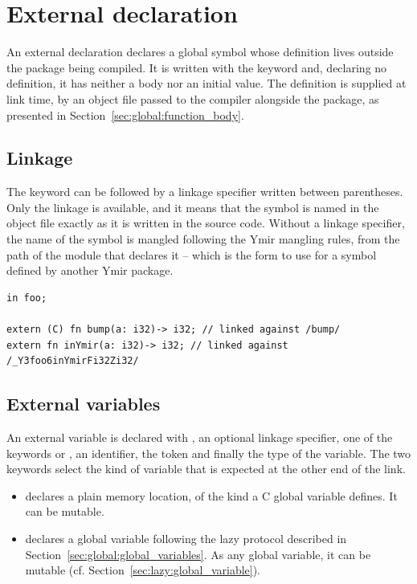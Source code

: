 \section{External declaration}%
\label{sec:global:extern_var}
\label{sec:global:external_decls}

An external declaration declares a global symbol whose definition lives outside
the package being compiled. It is written with the keyword  and,
declaring no definition, it has neither a body nor an initial value. The
definition is supplied at link time, by an object file passed to the compiler
alongside the package, as presented in Section~\ref{sec:global:function_body}.

\subsection{Linkage}

The keyword  can be followed by a linkage specifier written
between parentheses. Only the  linkage is available, and it means that
the symbol is named in the object file exactly as it is written in the source
code. Without a linkage specifier, the name of the symbol is mangled following
the Ymir mangling rules, from the path of the module that declares it -- which
is the form to use for a symbol defined by another Ymir package.

\begin{lstlisting}[style=coloredverbatim]
in foo;

extern (C) fn bump(a: i32)-> i32; // linked against /bump/
extern fn inYmir(a: i32)-> i32; // linked against /_Y3foo6inYmirFi32Zi32/
\end{lstlisting}

\subsection{External variables}

An external variable is declared with , an optional linkage
specifier, one of the keywords  or , an identifier,
the token \token{:} and finally the type of the variable. The two keywords
select the kind of variable that is expected at the other end of the link.

\begin{itemize}
\item {} declares a plain memory location, of the kind a C global
  variable defines. It can be mutable.
\item {} declares a global variable following the lazy protocol
  described in Section~\ref{sec:global:global_variables}. As any global
  variable, it can be mutable (cf. Section~\ref{sec:lazy:global_variable}).
\end{itemize}

